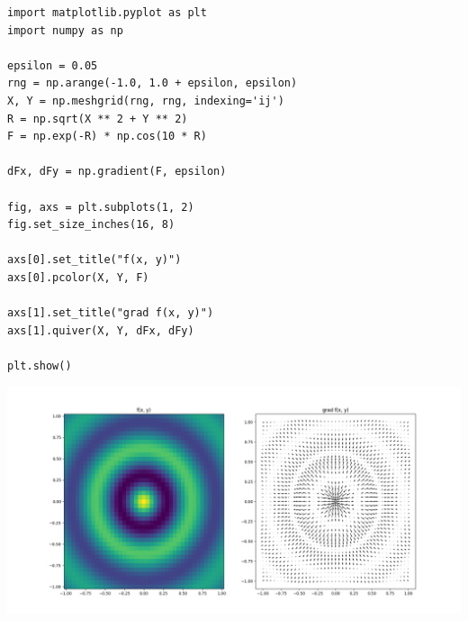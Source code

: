 
\begin{frame}[fragile]
%
\begin{codebox}
\begin{verbatim}
import matplotlib.pyplot as plt
import numpy as np

epsilon = 0.05
rng = np.arange(-1.0, 1.0 + epsilon, epsilon)
X, Y = np.meshgrid(rng, rng, indexing='ij')
R = np.sqrt(X ** 2 + Y ** 2)
F = np.exp(-R) * np.cos(10 * R)

dFx, dFy = np.gradient(F, epsilon)

fig, axs = plt.subplots(1, 2)
fig.set_size_inches(16, 8)

axs[0].set_title("f(x, y)")
axs[0].pcolor(X, Y, F)

axs[1].set_title("grad f(x, y)")
axs[1].quiver(X, Y, dFx, dFy)

plt.show()
\end{verbatim}
\end{codebox}
%
\end{frame}


\begin{frame}
%
\begin{defbox}
\includegraphics[width=\linewidth]{./gfx/06-derivatives-numpy}
\end{defbox}
%
\end{frame}



